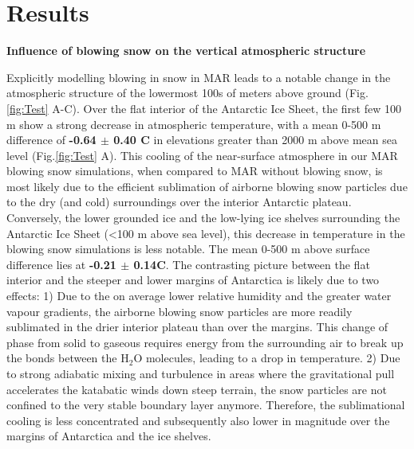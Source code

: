 \documentclass[12pt]{article}
\begin{document}
\section*{Results}


\textbf{Influence of blowing snow on the vertical atmospheric structure}

Explicitly modelling blowing in snow in MAR leads to a notable change in the atmospheric structure of the lowermost 100s of meters above ground (Fig.\ref{fig:Test} A-C). Over the flat interior of the Antarctic Ice Sheet, the first few 100 m show a strong decrease in atmospheric temperature, with a mean 0-500 m difference of \textbf{-0.64 $\pm$ 0.40 \textdegree C} in elevations greater than 2000 m above mean sea level (Fig.\ref{fig:Test} A). This cooling of the near-surface atmosphere in our MAR blowing snow simulations, when compared to MAR without blowing snow, is most likely due to the efficient sublimation of airborne blowing snow particles due to the dry (and cold) surroundings over the interior Antarctic plateau. Conversely, the lower grounded ice and the low-lying ice shelves surrounding the Antarctic Ice Sheet (<100 m above sea level), this decrease in temperature in the blowing snow simulations is less notable. The mean 0-500 m above surface difference lies at \textbf{-0.21 $\pm$ 0.14\textdegree C}. The contrasting picture between the flat interior and the steeper and lower margins of Antarctica is likely due to two effects: 1) Due to the on average lower relative humidity and the greater water vapour gradients, the airborne blowing snow particles are more readily sublimated in the drier interior plateau than over the margins. This change of phase from solid to gaseous requires energy from the surrounding air to break up the bonds between the H$_2$O molecules, leading to a drop in temperature. 2) Due to strong adiabatic mixing and turbulence in areas where the gravitational pull accelerates the katabatic winds down steep terrain, the snow particles are not confined to the very stable boundary layer anymore. Therefore, the sublimational cooling is less concentrated and subsequently also lower in magnitude over the margins of Antarctica and the ice shelves.
\end{document}

